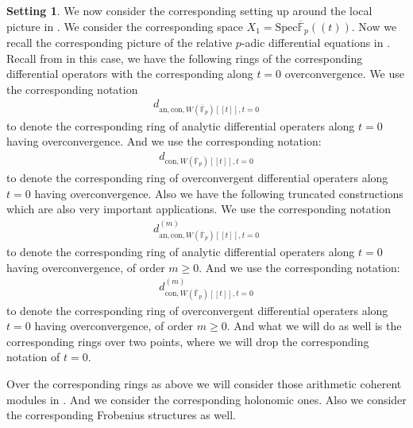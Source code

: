 \documentclass[11pt]{book}
\theoremstyle{definition}
\numberwithin{equation}{section}
\newtheorem{setting}[theorem]{Setting}
\begin{document}
\begin{setting}
\indent We now consider the corresponding setting up around the local picture in \cite{AM}. We consider the corresponding space $X_1=\mathrm{Spec}\overline{\mathbb{F}}_p((t))$. Now we recall the corresponding picture of the relative $p$-adic differential equations in \cite{AM}. Recall from \cite[Section 2.1.2,2.1.3,2.1.4]{AM} in this case, we have the following rings of the corresponding differential operators with the corresponding along $t=0$ overconvergence. We use the corresponding notation
\begin{align}
d_{\mathrm{an},\mathrm{con},W(\overline{\mathbb{F}}_p)[[t]],t=0}	
\end{align}
to denote the corresponding ring of analytic differential operaters along $t=0$ having overconvergence. And we use the corresponding notation:
\begin{align}
d_{\mathrm{con},W(\overline{\mathbb{F}}_p)[[t]],t=0}	
\end{align}
to denote the corresponding ring of overconvergent differential operaters along $t=0$ having overconvergence. Also we have the following truncated constructions which are also very important applications. We use the corresponding notation
\begin{align}
d^{(m)}_{\mathrm{an},\mathrm{con},W(\overline{\mathbb{F}}_p)[[t]],t=0}	
\end{align}
to denote the corresponding ring of analytic differential operaters along $t=0$ having overconvergence, of order $m\geq 0$. And we use the corresponding notation:
\begin{align}
d^{(m)}_{\mathrm{con},W(\overline{\mathbb{F}}_p)[[t]],t=0}	
\end{align}
to denote the corresponding ring of overconvergent differential operaters along $t=0$ having overconvergence, of order $m\geq 0$. And what we will do as well is the corresponding rings over two points, where we will drop the corresponding notation of $t=0$.
\end{setting}


\indent Over the corresponding rings as above we will consider those arithmetic coherent modules in \cite[Section 2.1.2,2.1.3,2.1.4]{AM}. And we consider the corresponding holonomic ones. Also we consider the corresponding Frobenius structures as well.
\end{document}
